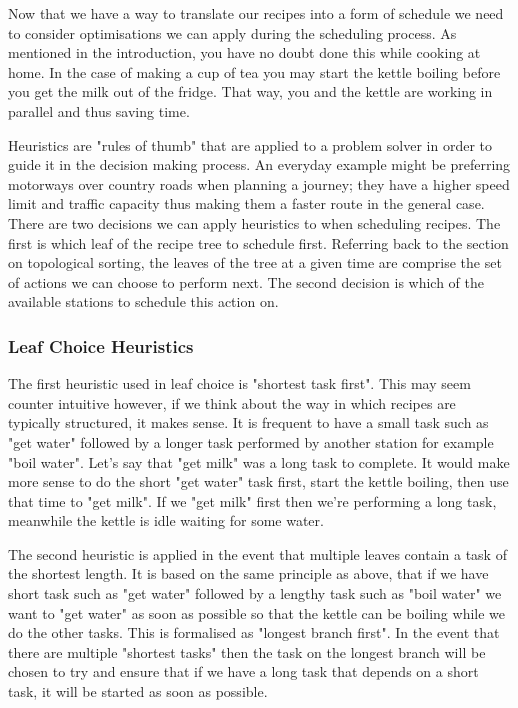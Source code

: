 \documentclass[11pt]{article}
\begin{document}
Now that we have a way to translate our recipes into a form of schedule we need to consider
optimisations we can apply during the scheduling process. As mentioned in the introduction,
you have no doubt done this while cooking at home. In the case of making a cup of tea you
may start the kettle boiling before you get the milk out of the fridge. That way, you and
the kettle are working in parallel and thus saving time.

\medbreak

Heuristics are "rules of thumb" that are applied to a problem solver in order to guide it
in the decision making process. An everyday example might be preferring motorways over country roads
when planning a journey; they have a higher speed limit and traffic capacity thus making
them a faster route in the general case. There are two decisions we can apply heuristics to
when scheduling recipes. The first is which leaf of the recipe tree to schedule first.
Referring back to the section on topological sorting, the leaves of the tree at a given time
are comprise the set of actions we can choose to perform next. The second decision is which
of the available stations to schedule this action on.

\subsubsection{Leaf Choice Heuristics}

The first heuristic used in leaf choice is "shortest task first". This may seem counter intuitive however,
if we think about the way in which recipes are typically structured, it makes sense. It is frequent
to have a small task such as "get water" followed by a longer task performed by another station
for example "boil water". Let's say that "get milk" was a long task to complete. It would make more
sense to do the short "get water" task first, start the kettle boiling, then use that time to
"get milk". If we "get milk" first then we're performing a long task, meanwhile the kettle is idle
waiting for some water.

\medbreak

The second heuristic is applied in the event that multiple leaves contain a task of the shortest length.
It is based on the same principle as above, that if we have short task such as "get water" followed
by a lengthy task such as "boil water" we want to "get water" as soon as possible so that the kettle
can be boiling while we do the other tasks. This is formalised as "longest branch first". In the
event that there are multiple "shortest tasks" then the task on the longest branch will be chosen
to try and ensure that if we have a long task that depends on a short task, it will be started
as soon as possible.
\end{document}

